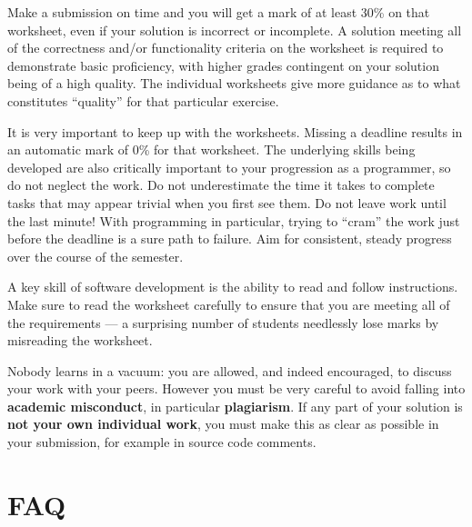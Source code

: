 \documentclass{../../fal_assignment}
\begin{document}
Make a submission on time and you will get a mark of at least 30\% on that worksheet,
even if your solution is incorrect or incomplete.
A solution meeting all of the correctness and/or functionality criteria on the worksheet is required to demonstrate basic proficiency,
with higher grades contingent on your solution being of a high quality.
The individual worksheets give more guidance as to what constitutes ``quality'' for that particular exercise.

It is very important to keep up with the worksheets. Missing a deadline results in an automatic mark of 0\% for that worksheet.
The underlying skills being developed are also critically important to your progression as a programmer, so do not neglect the work.
Do not underestimate the time it takes to complete tasks that may appear trivial when you first see them.
Do not leave work until the last minute! With programming in particular, trying to ``cram'' the work just before the deadline is a sure path to failure. Aim for consistent, steady progress over the course of the semester.

A key skill of software development is the ability to read and follow instructions.
Make sure to read the worksheet carefully to ensure that you are meeting all of the requirements ---
a surprising number of students needlessly lose marks by misreading the worksheet.

Nobody learns in a vacuum: you are allowed, and indeed encouraged, to discuss your work with your peers. However you must be very careful to avoid falling into \textbf{academic misconduct}, in particular \textbf{plagiarism}. If any part of your solution is \textbf{not your own individual work}, you must make this as clear as possible in your submission, for example in source code comments.

\section*{FAQ}
\end{document}
